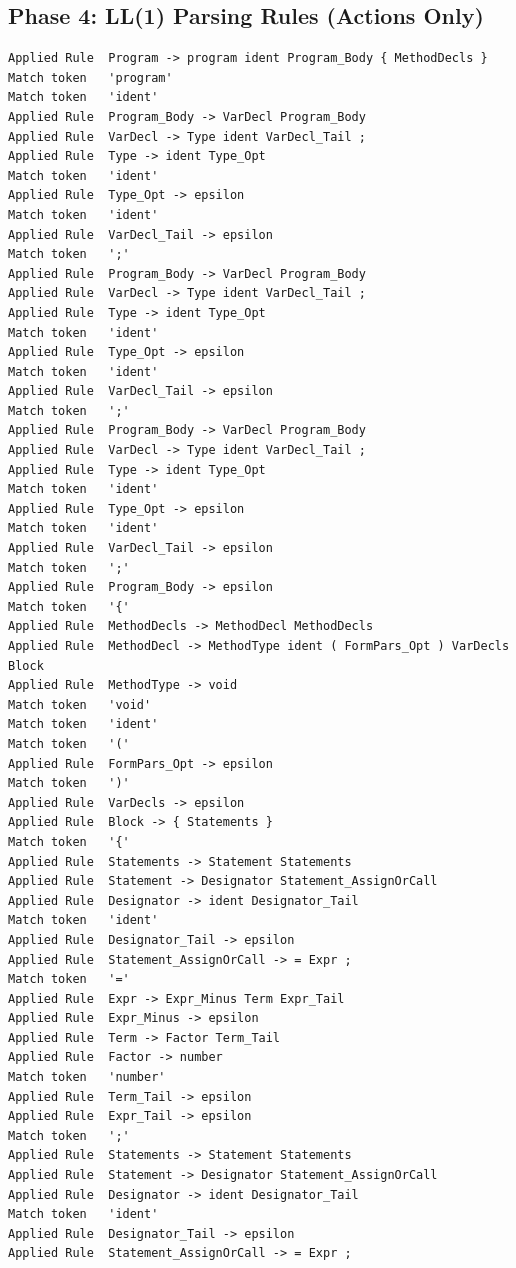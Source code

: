 \documentclass[11pt,a4paper]{article}
\begin{document}
\subsection{Phase 4: LL(1) Parsing Rules (Actions Only)}

\begin{lstlisting}[style=outputstyle]
Applied Rule  Program -> program ident Program_Body { MethodDecls }
Match token   'program'
Match token   'ident'
Applied Rule  Program_Body -> VarDecl Program_Body
Applied Rule  VarDecl -> Type ident VarDecl_Tail ;
Applied Rule  Type -> ident Type_Opt
Match token   'ident'
Applied Rule  Type_Opt -> epsilon
Match token   'ident'
Applied Rule  VarDecl_Tail -> epsilon
Match token   ';'
Applied Rule  Program_Body -> VarDecl Program_Body
Applied Rule  VarDecl -> Type ident VarDecl_Tail ;
Applied Rule  Type -> ident Type_Opt
Match token   'ident'
Applied Rule  Type_Opt -> epsilon
Match token   'ident'
Applied Rule  VarDecl_Tail -> epsilon
Match token   ';'
Applied Rule  Program_Body -> VarDecl Program_Body
Applied Rule  VarDecl -> Type ident VarDecl_Tail ;
Applied Rule  Type -> ident Type_Opt
Match token   'ident'
Applied Rule  Type_Opt -> epsilon
Match token   'ident'
Applied Rule  VarDecl_Tail -> epsilon
Match token   ';'
Applied Rule  Program_Body -> epsilon
Match token   '{'
Applied Rule  MethodDecls -> MethodDecl MethodDecls
Applied Rule  MethodDecl -> MethodType ident ( FormPars_Opt ) VarDecls Block
Applied Rule  MethodType -> void
Match token   'void'
Match token   'ident'
Match token   '('
Applied Rule  FormPars_Opt -> epsilon
Match token   ')'
Applied Rule  VarDecls -> epsilon
Applied Rule  Block -> { Statements }
Match token   '{'
Applied Rule  Statements -> Statement Statements
Applied Rule  Statement -> Designator Statement_AssignOrCall
Applied Rule  Designator -> ident Designator_Tail
Match token   'ident'
Applied Rule  Designator_Tail -> epsilon
Applied Rule  Statement_AssignOrCall -> = Expr ;
Match token   '='
Applied Rule  Expr -> Expr_Minus Term Expr_Tail
Applied Rule  Expr_Minus -> epsilon
Applied Rule  Term -> Factor Term_Tail
Applied Rule  Factor -> number
Match token   'number'
Applied Rule  Term_Tail -> epsilon
Applied Rule  Expr_Tail -> epsilon
Match token   ';'
Applied Rule  Statements -> Statement Statements
Applied Rule  Statement -> Designator Statement_AssignOrCall
Applied Rule  Designator -> ident Designator_Tail
Match token   'ident'
Applied Rule  Designator_Tail -> epsilon
Applied Rule  Statement_AssignOrCall -> = Expr ;

\end{lstlisting}
\end{document}
